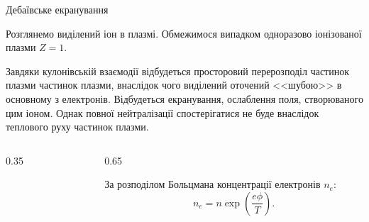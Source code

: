 \documentclass[]{beamer}
\begin{document}
\begin{frame}{Дебаївське екранування}{}

	\begin{block}{}\justifying\small
		Розглянемо виділений іон в плазмі. Обмежимося випадком одноразово іонізованої плазми $Z = 1$.
	\end{block}
	\begin{block}{}\justifying\scriptsize
		Завдяки кулонівській взаємодії відбудеться просторовий перерозподіл частинок плазми частинок плазми, внаслідок чого виділений оточений <<шубою>> в основному з електронів. Відбудеться екранування, ослаблення поля, створюваного цим іоном. Однак повної нейтралізації спостерігатися не буде внаслідок теплового руху
		частинок плазми.
	\end{block}
	\vspace*{-2em}
	\begin{columns}
		\begin{column}[t]{0.35\linewidth}
			\begin{figure}[h!]\centering
				
			\end{figure}
		\end{column}
		\begin{column}[t]{0.65\linewidth}
			\begin{overprint}
				\begin{block}{}\justifying\small
					За розподілом
					Больцмана концентрації електронів $n_e$:
					\begin{equation*}
						n_e = n\exp{\left( \frac{e\phi}{T}\right) }.
					\end{equation*}


\end{block}
\end{overprint}
\end{column}
\end{columns}
\end{frame}
\end{document}
